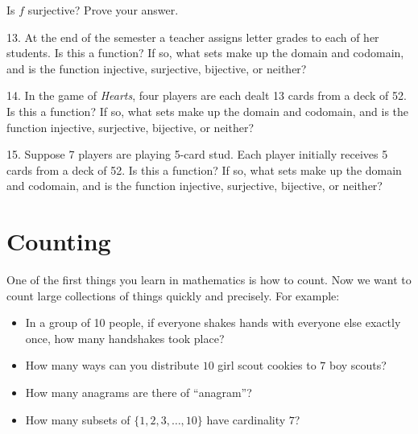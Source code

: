 \documentclass[10pt,]{book}
\theoremstyle{plain}
\theoremstyle{definition}
\theoremstyle{definition}
\theoremstyle{definition}
\numberwithin{equation}{section}
\begin{document}
\begin{exerciselist}
\begin{enumerate}[label=(\alph*)]
                Is \(f\) surjective? Prove your answer.
\end{enumerate}
\par\smallskip
\item[13.]\hypertarget{exercise-39}{}
            At the end of the semester a teacher assigns letter grades to each of her students. Is this a function? If so, what sets make up the domain and codomain, and is the function injective, surjective, bijective, or neither?
\par\smallskip
\item[14.]\hypertarget{exercise-40}{}
            In the game of \emph{Hearts}, four players are each dealt 13 cards from a deck of 52. Is this a function? If so, what sets make up the domain and codomain, and is the function injective, surjective, bijective, or neither?
\par\smallskip
\item[15.]\hypertarget{exercise-41}{}
            Suppose 7 players are playing 5-card stud. Each player initially receives 5 cards from a deck of 52. Is this a function? If so, what sets make up the domain and codomain, and is the function injective, surjective, bijective, or neither?
\par\smallskip
\end{exerciselist}
\typeout{************************************************}
\typeout{************************************************}
\chapter[Counting]{Counting}\label{ch_counting}
\typeout{************************************************}
\typeout{************************************************}

One of the first things you learn in mathematics is how to count. Now we want to count large collections of things quickly and precisely. For example:
%
\leavevmode%
\begin{itemize}[label=\textbullet]
\item{}
In a group of 10 people, if everyone shakes hands with everyone else exactly once, how many handshakes took place?
%
\item{}
How many ways can you distribute \(10\) girl scout cookies to \(7\) boy scouts?
%
\item{}
How many anagrams are there of ``anagram''?
%
\item{}
How many subsets of \(\{1,2,3,\ldots, 10\}\) have cardinality \(7\)?
%
\end{itemize}
\par
\end{document}
